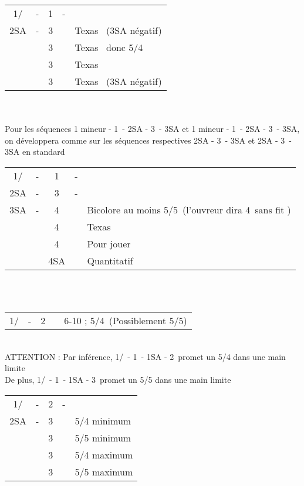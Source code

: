\documentclass[a4paper, oneside, 11pt]{report}
\begin{document}
		\begin{tabular}{cccc|l}
		1\trefle/\carreau & - & 1\pique & - &\\
		2SA & - & 3\trefle && Texas \carreau\ (3SA négatif)\\
		&& 3\carreau && Texas \coeur\ donc 5\pique/4\coeur\\
		&& 3\coeur && Texas \pique\\
		&& 3\pique && Texas \trefle\ (3SA négatif)\\
		\end{tabular}\\\\
		
		Pour les séquences 1 mineur - 1\coeur\ - 2SA - 3\carreau\ - 3SA et 1 mineur - 1\pique\ - 2SA - 3\coeur\ - 3SA, on développera comme sur les séquences respectives 2SA - 3\carreau\ - 3SA et 2SA - 3\coeur\ - 3SA en standard\\
	
		\begin{tabular}{cccc|l}
		1\trefle/\carreau & - & 1\pique & - &\\
		2SA & - & 3\carreau & - &\\
		3SA & - & 4\carreau && Bicolore au moins 5\pique/5\coeur\ (l'ouvreur dira 4\pique\ sans fit \coeur)\\
		&& 4\coeur && Texas \pique\\
		&& 4\pique && Pour jouer\\
		&& 4SA && Quantitatif\\
		\end{tabular}\\\\

		\begin{tabular}{cccc|l}
		1\trefle/\carreau & - & 2\coeur && 6-10 ; 5\pique/4\coeur\ (Possiblement 5/5)\\
		\end{tabular}\\
		ATTENTION : Par inférence, 1\trefle/\carreau\ - 1\pique\ - 1SA - 2\coeur\ promet un 5/4 dans une main limite\\
		De plus, 1\trefle/\carreau\ - 1\pique\ - 1SA - 3\coeur\ promet un 5/5 dans une main limite\\
	
		\begin{tabular}{cccc|l}
		1\trefle/\carreau & - & 2\coeur & - &\\
		2SA & - & 3\trefle && 5/4 minimum\\
		&& 3\carreau && 5/5 minimum\\
		&& 3\coeur && 5/4 maximum\\
		&& 3\pique && 5/5 maximum\\
		\end{tabular}\\\\
	
\end{document}
